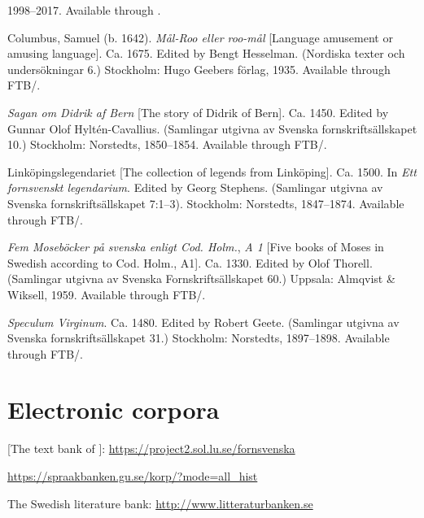 \documentclass[output=paper, colorlinks, citecolor=brown]{langscibook}
\begin{document}
\begin{description}[font=\normalfont]\sloppy
\item[Bloggmix] [A selection of Swedish blogs] 1998–2017. Available through .
\item[Columbus:]Columbus, Samuel (b. 1642). \textit{Mål-Roo eller roo-mål} [Language amusement or amusing language]. Ca. 1675. Edited by Bengt Hesselman. (Nordiska texter och undersökningar 6.) Stockholm: Hugo Geebers förlag, 1935. Available through FTB/.
\item[Di:]\textit{Sagan om Didrik af Bern} [The story of Didrik of Bern]. Ca. 1450. Edited by Gunnar Olof Hyltén-Cavallius. (Samlingar utgivna av Svenska fornskriftsällskapet 10.) Stockholm: Norstedts, 1850–1854. Available through FTB/.
\item[LinLeg:]Linköpingslegendariet [The collection of legends from Linköping]. Ca. 1500. In \textit{Ett fornsvenskt legendarium}. Edited by Georg Stephens. (Samlingar utgivna av Svenska fornskriftsällskapet 7:1–3). Stockholm: Norstedts, 1847–1874. Available through FTB/.
\item[MB1B:]\textit{Fem Moseböcker på svenska enligt Cod. Holm.}, \textit{A 1} [Five books of Moses in Swedish according to Cod. Holm., A1]. Ca. 1330. Edited by Olof Thorell. (Samlingar utgivna av Svenska Fornskriftsällskapet 60.) Uppsala: Almqvist \& Wiksell, 1959. Available through FTB/.
\item[SpecV:]\textit{Speculum Virginum}. Ca. 1480. Edited by Robert Geete. (Samlingar utgivna av Svenska fornskriftsällskapet 31.) Stockholm: Norstedts, 1897–1898. Available through FTB/.
\end{description}

\section*{Electronic corpora}

\begin{description}[font=\normalfont]\sloppy
\item[FTB:]  [The text bank of ]:  \url{https://project2.sol.lu.se/fornsvenska} 
\item[\isi{Korp}:] \url{https://spraakbanken.gu.se/korp/?mode=all_hist}
\item[LB:] The Swedish literature bank: \url{http://www.litteraturbanken.se}
\end{description}

{\sloppy\printbibliography[heading=subbibliography,notkeyword=this]}
\end{document}
